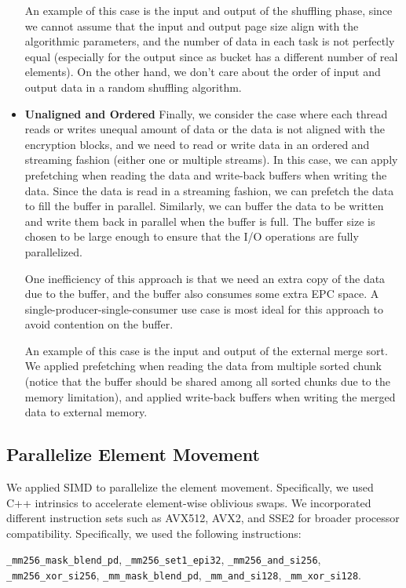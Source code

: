 \documentclass{article}
\begin{document}
\begin{itemize}
    An example of this case is the input and output of the shuffling phase, since we cannot assume that the input and output page size align with the algorithmic parameters, and the number of data in each task is not perfectly equal (especially for the output since as bucket has a different number of real elements). On the other hand, we don't care about the order of input and output data in a random shuffling algorithm.
    \item {\bf Unaligned and Ordered}
    Finally, we consider the case where each thread reads or writes unequal amount of data or the data is not aligned with the encryption blocks, and we need to read or write data in an ordered and streaming fashion (either one or multiple streams). In this case, we can apply prefetching when reading the data and write-back buffers when writing the data. Since the data is read in a streaming fashion, we can prefetch the data to fill the buffer in parallel. Similarly, we can buffer the data to be written and write them back in parallel when the buffer is full. The buffer size is chosen to be large enough to ensure that the I/O operations are fully parallelized.

    One inefficiency of this approach is that we need an extra copy of the data due to the buffer, and the buffer also consumes some extra EPC space. A single-producer-single-consumer use case is most ideal for this approach to avoid contention on the buffer.

    An example of this case is the input and output of the external merge sort. We applied prefetching when reading the data from multiple sorted chunk (notice that the buffer should be shared among all sorted chunks due to the memory limitation), and applied write-back buffers when writing the merged data to external memory.
\end{itemize}
\subsection{Parallelize Element Movement}
\label{sec:simd}
We applied SIMD to parallelize the element movement. Specifically, we used C++ intrinsics to accelerate element-wise oblivious swaps. We incorporated different instruction sets such as AVX512, AVX2, and SSE2 for broader processor compatibility. Specifically, we used the following instructions: 

{\tt \_mm256\_mask\_blend\_pd}, {\tt \_mm256\_set1\_epi32}, {\tt \_mm256\_and\_si256},\\ {\tt \_mm256\_xor\_si256}, {\tt \_mm\_mask\_blend\_pd}, {\tt \_mm\_and\_si128}, {\tt \_mm\_xor\_si128}. 
\end{document}
